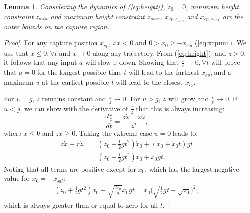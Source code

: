 \documentclass[letterpaper, 10 pt, conference]{ieeeconf}  %
\newcommand{\zmin}{z_{min}}
\newcommand{\zmax}{z_{max}}
\newtheorem{lem}{Lemma}
\begin{document}
\begin{lem}\label{lem:regionz}
Considering the dynamics of (\ref{eq:height}), $\dot{z}_0=0$, minimum height constraint $\zmin$ and maximum height constraint $\zmax$, $x_{cp,\zmin}$ and $x_{cp,\zmax}$ are the outer bounds on the capture region.
\end{lem}
\begin{proof}
For any capture position $x_{cp}$, $x\dot{x}<0$ \cite{koolen2016balance} and $0>x_0\geq-x_{bal}$ (\ref{eq:xcpuni}). 
We use that $x \leq 0, \forall t$ and $x\rightarrow 0$ along any trajectory. From (\ref{eq:height}), and $z>0$, it follows that any input $u$ will slow $\dot{x}$ down. Showing that $\frac{x}{z}\rightarrow 0, \forall t$ will prove that $u=0$ for the longest possible time $t$ will lead to the farthest $x_{cp}$, and a maximum $u$ at the earliest possible $t$ will lead to the closest $x_{cp}$. 

For $u=g$, $z$ remains constant and $\frac{x}{z}\rightarrow 0$. For $u>g$, $z$ will grow and $\frac{x}{z}\rightarrow 0$. If $u<g$, we can show with the derivative of $\frac{x}{z}$ that this is always increasing:
\begin{equation}
\frac{d\frac{x}{z}}{dt}= \frac{z\dot{x}-x\dot{z}}{z^2},
\end{equation}
where $x \leq 0$ and $z \dot{x} \geq 0$. Taking the extreme case $u=0$ leads to:
\begin{align}
	z\dot{x}-x\dot{z} &= (z_0 - \frac{1}{2}gt^2)\dot{x}_0 + (x_0 + \dot{x}_0 t)gt\\
	&= (z_0 +\frac{1}{2}gt^2)\dot{x}_0 + x_0gt.
\end{align}
Noting that all terms are positive except for $x_0$, which has the largest negative value for $x_0=-x_{bal}$:
\begin{align}
	(z_0 +\frac{1}{2}gt^2)\dot{x}_0 - \sqrt{\frac{2z_0}{g}}\dot{x}_0gt = \dot{x}_0\bigg(\sqrt{\frac{1}{2}g}t - \sqrt{z_0}\bigg)^2,
\end{align}
which is always greater than or equal to zero for all $t$.
\end{proof}
\end{document}

